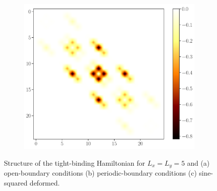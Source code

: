 \documentclass[11pt, a4paper]{article}
\theoremstyle{definition} %
\begin{document}
\begin{figure}[h]
\begin{subfigure}[b]{0.31\textwidth}
			\includegraphics[width = \textwidth]{ColorMapMatrix_SSD_2D}	
			\caption{}
		\end{subfigure}
		\caption{Structure of the tight-binding Hamiltonian for $L_x = L_y = 5$ and (a) open-boundary conditions (b) periodic-boundary conditions (c) sine-squared deformed.}
\end{figure}
\end{document}
